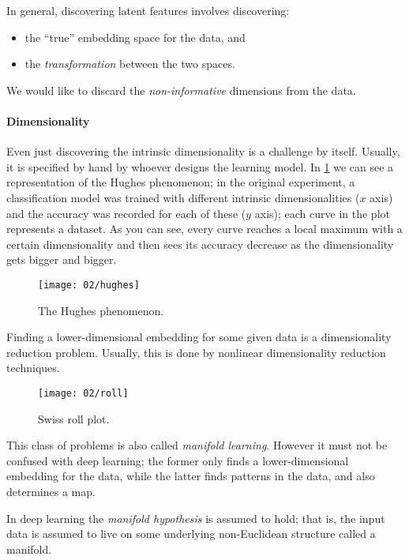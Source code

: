In general, discovering latent features involves discovering:
\begin{itemize}
	\item the ``true'' embedding space for the data, and
	\item the \emph{transformation} between the two spaces.
\end{itemize}

We would like to discard the \emph{non-informative} dimensions from the data.

\paragraph{Dimensionality}

Even just discovering the intrinsic dimensionality is a challenge by itself. Usually, it is specified by hand by whoever designs the learning model. 
In \cref{fig:hughes} we can see a representation of the Hughes phenomenon; in the original experiment, a classification model was trained with different intrinsic dimensionalities ($x$ axis) and the accuracy was recorded for each of these ($y$ axis); each curve in the plot represents a dataset. 
As you can see, every curve reaches a local maximum with a certain dimensionality and then sees its accuracy decrease as the dimensionality gets bigger and bigger. 

\begin{figure}[H]
	\centering
	\texttt{[image: 02/hughes]}
	\caption{The Hughes phenomenon.}\label{fig:hughes}	
\end{figure}

Finding a lower-dimensional embedding for some given data is a dimensionality reduction problem. Usually, this is done by nonlinear dimensionality reduction techniques.

\begin{figure}[H]
	\centering
	\texttt{[image: 02/roll]}
	\caption{Swiss roll plot.}\label{fig:roll}	
\end{figure}

This class of problems is also called \emph{manifold learning}. However it must not be confused with deep learning; the former only finds a lower-dimensional embedding for the data, while the latter finds patterns in the data, and also determines a map.

In deep learning the \emph{manifold hypothesis} is assumed to hold; that is, the input data is assumed to live on some underlying non-Euclidean structure called a manifold.

